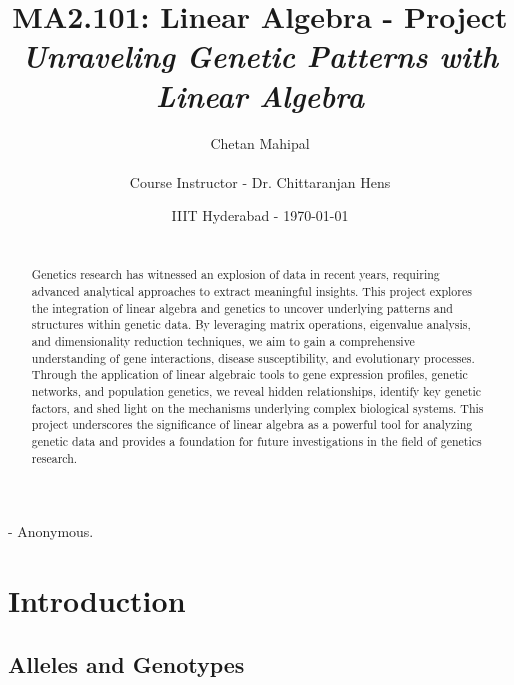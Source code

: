\documentclass[a4paper,12pt]{article}
\begin{document}

\title{MA2.101: Linear Algebra - Project \\ \textbf{\textit{Unraveling Genetic Patterns with Linear Algebra}}} %

\author{Chetan Mahipal\\ \\ Course Instructor - Dr. Chittaranjan Hens} %
\date{IIIT Hyderabad - \today} %
\maketitle
\textit{} - Anonymous.
\begin{abstract} 
\ \\
Genetics research has witnessed an explosion of data in recent years, requiring advanced analytical approaches to extract meaningful insights. This project explores the integration of linear algebra and genetics to uncover underlying patterns and structures within genetic data. By leveraging matrix operations, eigenvalue analysis, and dimensionality reduction techniques, we aim to gain a comprehensive understanding of gene interactions, disease susceptibility, and evolutionary processes. Through the application of linear algebraic tools to gene expression profiles, genetic networks, and population genetics, we reveal hidden relationships, identify key genetic factors, and shed light on the mechanisms underlying complex biological systems. This project underscores the significance of linear algebra as a powerful tool for analyzing genetic data and provides a foundation for future investigations in the field of genetics research.

\end{abstract}
\section{Introduction}
\subsection{Alleles and Genotypes}
\end{document}
